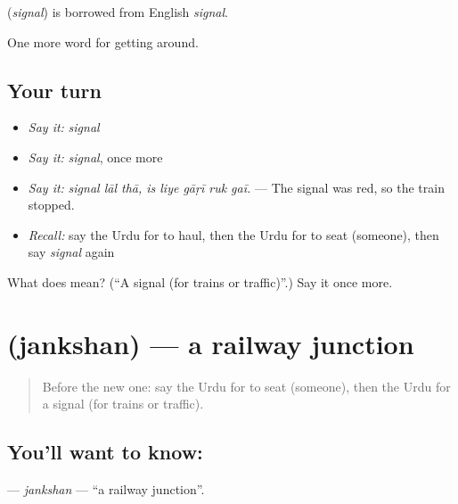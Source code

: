 \begin{cousinweb}
\textbf{} (\emph{signal}) is borrowed from English \emph{signal}.
\end{cousinweb}

\begin{grammarlens}[title={What you've built}]
One more word for getting around.
\end{grammarlens}

\subsection*{Your turn}
\begin{itemize}
\raggedright
  \item \emph{Say it:} \emph{signal}
  \item \emph{Say it:} \emph{signal}, once more
  \item \emph{Say it:} \emph{signal lāl thā, is liye gāṛī ruk gaī.} — The signal was red, so the train stopped.
  \item \emph{Recall:} say the Urdu for to haul, then the Urdu for to seat (someone), then say \emph{signal} again
\end{itemize}

\begin{tcolorbox}[breakable,colback=teal!4,colframe=teal!35!black,title={Before you move on}]
What does  mean? (\textquotedblleft{}A signal (for trains or traffic)\textquotedblright{}.) Say it once more.
\end{tcolorbox}
\section[\texorpdfstring{\ur{جنکشن} (jankshan)}{جنکشن (jankshan)}]{ (jankshan) — a railway junction}

\label{lesson:UR-C388-jankshan}



\begin{quote}
Before the new one: say the Urdu for to seat (someone), then the Urdu for a signal (for trains or traffic).
\end{quote}

\subsection*{You'll want to know: }
\textbf{} — \emph{jankshan} — \textquotedblleft{}a railway junction\textquotedblright{}.

